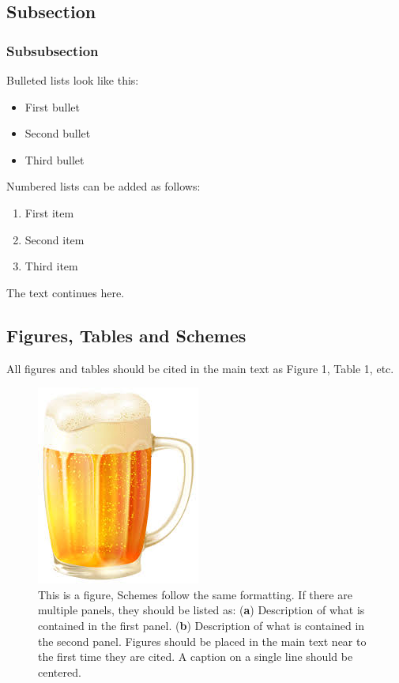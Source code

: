 \documentclass[bioengineering,article,submit,moreauthors,pdftex,10pt,a4paper]{mdpi}
\begin{document}
\subsection{Subsection}

\subsubsection{Subsubsection}

Bulleted lists look like this:
\begin{itemize}[leftmargin=*,labelsep=5.8mm]
\item	First bullet
\item	Second bullet
\item	Third bullet
\end{itemize}

Numbered lists can be added as follows:
\begin{enumerate}[leftmargin=*,labelsep=4.9mm]
\item	First item 
\item	Second item
\item	Third item
\end{enumerate}

The text continues here.

\subsection{Figures, Tables and Schemes}

All figures and tables should be cited in the main text as Figure 1, Table 1, etc.

 \begin{figure}[H]
 	\caption{\label{beer}This is a figure, Schemes follow the same formatting. If there are multiple panels, they should be listed as: (\textbf{a}) Description of what is contained in the first panel. (\textbf{b}) Description of what is contained in the second panel. Figures should be placed in the main text near to the first time they are cited. A caption on a single line should be centered.}
 	\begin{center}
 		\includegraphics[scale=0.40]{imagens/beer.jpg} 		
 	\end{center}
 \end{figure}  
\end{document}
